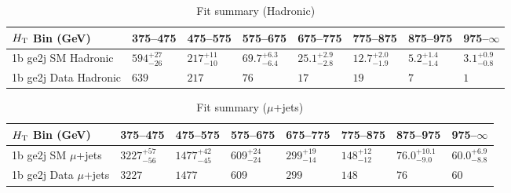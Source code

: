 \documentclass[8pt]{article}
\def\scalht{\mbox{$H_{\rm{T}}$}\xspace}
\newcommand\T{\rule{0pt}{2.6ex}}
\begin{document}
\begin{table}[ht!]
\caption{Fit summary (Hadronic)}
\label{tab:ensemble-summary}
\centering
\begin{tabular}{ llllllll }

\hline
\scalht Bin (GeV)       & 375--475                       & 475--575                       & 575--675                       & 675--775                       & 775--875                       & 875--975                       & 975--$\infty$                  \\ [1.000000ex]
\hline
1b ge2j SM Hadronic\T   & $594^{+27}_{-26}$              & $217^{+11}_{-10}$              & $69.7^{+6.3}_{-6.4}$           & $25.1^{+2.9}_{-2.8}$           & $12.7^{+2.0}_{-1.9}$           & $5.2^{+1.4}_{-1.4}$            & $3.1^{+0.9}_{-0.8}$            \\ 
1b ge2j Data Hadronic\T & $639$                          & $217$                          & $76$                           & $17$                           & $19$                           & $7$                            & $1$                            \\ 
\hline

\end{tabular}
\end{table}
\begin{table}[ht!]
\caption{Fit summary ($\mu$+jets)}
\label{tab:ensemble-summary}
\centering
\begin{tabular}{ llllllll }

\hline
\scalht Bin (GeV)       & 375--475                       & 475--575                       & 575--675                       & 675--775                       & 775--875                       & 875--975                       & 975--$\infty$                  \\ [1.000000ex]
\hline
1b ge2j SM $\mu$+jets\T & $3227^{+57}_{-56}$             & $1477^{+42}_{-45}$             & $609^{+24}_{-24}$              & $299^{+19}_{-14}$              & $148^{+12}_{-12}$              & $76.0^{+10.1}_{-9.0}$          & $60.0^{+6.9}_{-8.8}$           \\ 
1b ge2j Data $\mu$+jets\T & $3227$                         & $1477$                         & $609$                          & $299$                          & $148$                          & $76$                           & $60$                           \\ 
\hline

\end{tabular}
\end{table}
\end{document}
